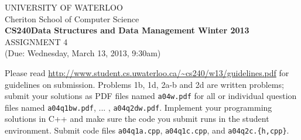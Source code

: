 \documentclass[11pt]{article}
\begin{document}
%
%
\begin{center}
UNIVERSITY OF WATERLOO\\
Cheriton School of Computer Science\\[\baselineskip]
{\bf CS240\hfill Data Structures and Data Management \hfill
Winter 2013}\\[\baselineskip]
{\sc \large ASSIGNMENT 4}\\
(Due: Wednesday, March 13, 2013, 9:30am)\\[2\baselineskip]
\end{center}
%
%

\noindent
Please read \url{http://www.student.cs.uwaterloo.ca/~cs240/w13/guidelines.pdf} for guidelines on submission. 
Problems 1b, 1d, 2a-b and 2d are written problems; submit your solutions as PDF files named {\tt a04w.pdf} for all or individual question files named {\tt a04q1bw.pdf}, ... , {\tt a04q2dw.pdf}. 
Implement your programming solutions in C++ and make sure the code you submit runs in the student environment.
Submit code files {\tt a04q1a.cpp}, {\tt a04q1c.cpp}, and {\tt a04q2c.\{h,cpp\}}.
\noindent
\end{document}
